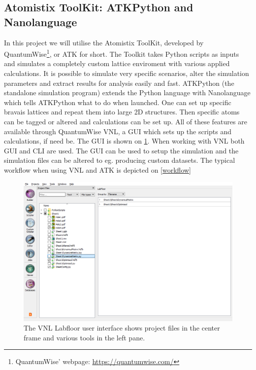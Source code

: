 
\subsection{Atomistix ToolKit: ATKPython and Nanolanguage}
In this project we will utilise the Atomistix ToolKit, developed by QuantumWise\footnote{QuantumWise' webpage: \href{https://quantumwise.com/}{https://quantumwise.com/}}, or ATK for short. The Toolkit takes Python scripts as inputs and simulates a completely custom lattice enviroment with various applied calculations. It is possible to simulate very specific scenarios, alter the simulation parameters and extract results for analysis easily and fast.
ATKPython (the standalone simulation program) extends the Python language with Nanolanguage which tells ATKPython what to do when launched. One can set up specific bravais lattices and repeat them into large 2D structures. Then specific atoms can be tagged or altered and calculations can be set up. All of these features are available through QuantumWise VNL, a GUI which sets up the scripts and calculations, if need be. The GUI is shown on \cref{VNLLAB}. When working with VNL both GUI and CLI are used. The GUI can be used to setup the simulation and the simulation files can be altered to eg. producing custom datasets. The typical workflow when using VNL and ATK is depicted on \cref{workflow}
\begin{figure}
 \centering
 \includegraphics[width=\columnwidth]{Figures/VNLLabfloor.png}
 \caption{The VNL Labfloor user interface shows project files in the center frame and various tools in the left pane.}
 \label{VNLLAB}
\end{figure}
